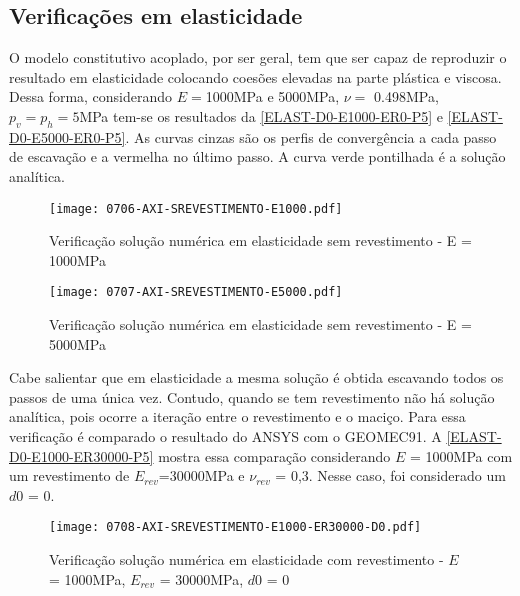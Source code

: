\subsection{Verificações em elasticidade}

O modelo constitutivo acoplado, por ser geral, tem que ser capaz de reproduzir o resultado em elasticidade colocando coesões elevadas na parte plástica e viscosa. Dessa forma, considerando $E =$1000MPa e 5000MPa, $\nu =$ 0.498MPa, $p_v = p_h = 5$MPa tem-se os resultados da \autoref{ELAST-D0-E1000-ER0-P5} e \autoref{ELAST-D0-E5000-ER0-P5}. As curvas cinzas são os perfis de convergência a cada passo de escavação e a vermelha no último passo. A curva verde pontilhada é a solução analítica.

\begin{figure}[H]
	\begin{center}
		\texttt{[image: 0706-AXI-SREVESTIMENTO-E1000.pdf]}
	\end{center}
	\caption{\label{ELAST-D0-E1000-ER0-P5}Verificação solução numérica em elasticidade sem revestimento - E = 1000MPa}
\end{figure}

\begin{figure}[H]
	\begin{center}
		\texttt{[image: 0707-AXI-SREVESTIMENTO-E5000.pdf]}
	\end{center}
	\caption{\label{ELAST-D0-E5000-ER0-P5}Verificação solução numérica em elasticidade sem revestimento - E = 5000MPa}
\end{figure}

Cabe salientar que em elasticidade a mesma solução é obtida escavando todos os passos de uma única vez. Contudo, quando se tem revestimento não há solução analítica, pois ocorre a iteração entre o revestimento e o maciço. Para essa verificação é comparado o resultado do ANSYS com o GEOMEC91. A \autoref{ELAST-D0-E1000-ER30000-P5} mostra essa comparação considerando $E$ = 1000MPa com um revestimento de $E_{rev}$=30000MPa e $\nu_{rev}$ = 0,3. Nesse caso, foi considerado um $d0$ = 0.

\begin{figure}[H]
	\begin{center}
		\texttt{[image: 0708-AXI-SREVESTIMENTO-E1000-ER30000-D0.pdf]}
	\end{center}
	\caption{\label{ELAST-D0-E1000-ER30000-P5}Verificação solução numérica em elasticidade com revestimento - $E$ = 1000MPa, $E_{rev}$ = 30000MPa, $d0$ = 0}
\end{figure}

